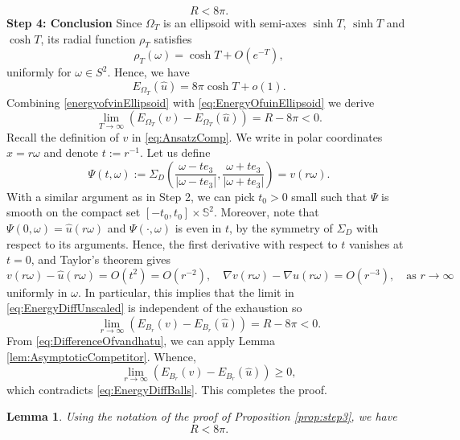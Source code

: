 \documentclass[11pt]{article}
\theoremstyle{plain}
\numberwithin{equation}{section}
\newtheorem{lemma}[theorem]{Lemma}
\theoremstyle{definition}
\let\oldendproof\endproof
\renewenvironment{proof}[1][\proofname]{%
\oldproof[\upshape \bfseries #1]%
}{\oldendproof}
\def \mb{\mathbb}
\newcommand{\Om}{\Omega}
\begin{document}
\begin{proof}[Proof of Proposition \ref{prop:step3}]
\begin{equation}
        \label{Rlesseightpi}
        R<8\pi.
    \end{equation}
    \textbf{Step 4: Conclusion} Since $\Omega_T$ is an ellipsoid with semi-axes $\sinh T$, $\sinh T$ and $\cosh T$, its radial function $\rho_T$ satisfies
    \[
    \rho_T(\omega)=\cosh T +O(e^{-T}),
    \]
    uniformly for $\omega \in S^2$. Hence, we have
    \begin{equation}
        \label{eq:EnergyOfuinEllipsoid}
        E_{\Om_T}(\hat u)=8\pi\cosh T+o(1).
    \end{equation}
    Combining \eqref{energyofvinEllipsoid} with \eqref{eq:EnergyOfuinEllipsoid} we derive
    \begin{equation}
        \label{eq:EnergyDiffUnscaled}
        \lim_{T \to\infty}(E_{\Om_T}(v)-E_{\Om_T}(\hat u))=R-8\pi<0.
    \end{equation}
    Recall the definition of $v$ in \eqref{eq:AnsatzComp}. We write in polar coordinates $x=r\omega$ and denote $t:=r^{-1}$. Let us define
    \[
    \Psi(t,\omega):=\Sigma_D\left(\frac{\omega-te_3}{|\omega-te_3|},\frac{\omega+te_3}{|\omega+te_3|}\right) =v(r\omega).
    \]
    With a similar argument as in Step 2, we can pick $t_0>0$ small such that $\Psi$ is smooth on the compact set $[-t_0,t_0]\times \mb S^2$. Moreover, note that $\Psi(0,\omega)=\hat u(r\omega)$ and $\Psi(\cdot,\omega)$ is even in $t$, by the symmetry of $\Sigma_D$ with respect to its arguments. Hence, the first derivative with respect to $t$ vanishes at $t=0$, and Taylor's theorem gives
    \begin{equation}
        \label{eq:DifferenceOfvandhatu}
        v(r\omega)-\hat u(r\omega)=O(t^2)=O(r^{-2}),\quad\nabla v(r\omega)-\nabla\hat u(r\omega)=O(r^{-3}) ,\quad \text{as }r\to \infty
    \end{equation}
    uniformly in $\omega$. In particular, this implies that the limit in \eqref{eq:EnergyDiffUnscaled} is independent of the exhaustion so
    \begin{equation}
        \label{eq:EnergyDiffBalls}
        \lim_{r \to \infty}(E_{B_r}(v)-E_{B_r}(\hat u))=R-8\pi<0.
    \end{equation}
    From \eqref{eq:DifferenceOfvandhatu}, we can apply Lemma \ref{lem:AsymptoticCompetitor}. Whence,
    \[
        \lim_{r \to \infty}(E_{B_r}(v)-E_{B_r}(\hat u))\geq 0,
    \]
    which contradicts \eqref{eq:EnergyDiffBalls}. This completes the proof.
\end{proof}

\begin{lemma}
    \label{lem:EnergyCompR}
    Using the notation of the proof of Proposition \ref{prop:step3}, we have
    \[
    R<8\pi.
    \]
\end{lemma}
\end{document}
